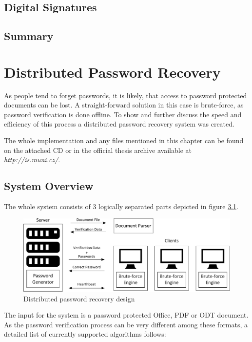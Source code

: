 \documentclass[11pt,oneside]{fithesis2}
\begin{document}
\section{Digital Signatures}

\section{Summary}

\chapter{Distributed Password Recovery}

As people tend to forget passwords, it is likely, that access to password protected documents can be lost. A straight-forward solution in this case is brute-force, as password verification is done offline. To show and further discuss the speed and efficiency of this process a distributed password recovery system was created.

The whole implementation and any files mentioned in this chapter can be found on the attached CD or in the official thesis archive available at \textit{http://is.muni.cz/}.

\section{System Overview}

The whole system consists of 3 logically separated parts depicted in figure \ref{ddpbf_design}. 

\begin{figure}[ht]
	\centering
	\includegraphics[width=1\textwidth]{figures/ddpbf_design.pdf}
	\caption{Distributed password recovery design}
	\label{ddpbf_design}
\end{figure}

The input for the system is a password protected Office, PDF or ODT document. As the password verification process can be very different among these formats, a detailed list of currently supported algorithms follows:
\end{document}

